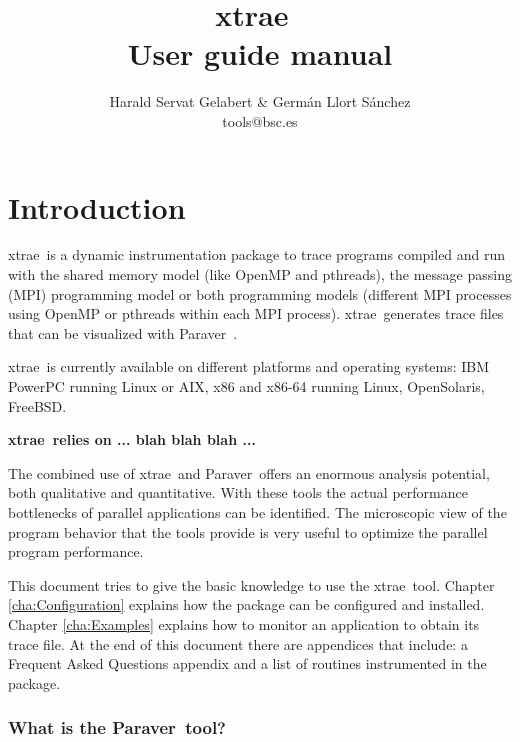 \documentclass[twoside,a4,english,11pt]{book}
\newcommand{\TRACE}{{\sf {E}xtrae}\ }
\newcommand{\PARAVER}{{\sf Paraver}\ }
\begin{document}


\title{\TRACE \\
       User guide manual}
\author{
Harald Servat Gelabert \& Germ\'an Llort S\'anchez\\
tools@bsc.es
}

\maketitle
\tableofcontents
\listoffigures
\listoftables






\chapter{Introduction}\label{cha:Introduction}

\TRACE is a dynamic instrumentation package to trace programs compiled and run with the shared memory model (like OpenMP and pthreads), the message passing (MPI) programming model or both programming models (different MPI processes using OpenMP or pthreads within each MPI process). \TRACE generates trace files that can be visualized with \PARAVER.

\TRACE is currently available on different platforms and operating systems: IBM PowerPC running Linux or AIX, x86 and x86-64 running Linux, OpenSolaris, FreeBSD.

{\bf \TRACE relies on ... blah blah blah ...}

The combined use of \TRACE and \PARAVER offers an enormous analysis potential, both qualitative and quantitative. With these tools the actual performance bottlenecks of parallel applications can be identified. The microscopic view of the program behavior that the tools provide is very useful to optimize the parallel program performance.

This document tries to give the basic knowledge to use the \TRACE tool. Chapter \ref{cha:Configuration} explains how the package can be configured and installed. Chapter \ref{cha:Examples} explains how to monitor an application to obtain its trace file. At the end of this document there are appendices that include: a Frequent Asked Questions appendix and a list of routines instrumented in the package.

\subsection*{What is the \PARAVER tool?}
\end{document}
